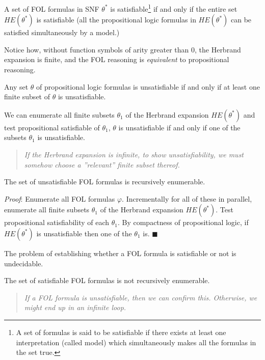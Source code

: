 \documentclass[10pt, letterpaper]{report}
\begin{document}
\begin{theorem}[Herbrand]\label{teo:Herbrand}
    A set of FOL formulas in SNF $\theta^*$ is satisfiable\footnote{
       A set of formulas is said to be satisfiable if there exists at least one interpretation (called model) which simultaneously makes all the formulas in the set true.
    }
    if and only if the entire set $HE(\theta^*)$ is satisfiable (all the propositional logic formulas in $HE(\theta^*)$ can be satisfied simultaneously by a model.)
\end{theorem}
Notice how, without function symbols of arity greater than 0, the Herbrand expansion is finite, and the FOL reasoning is \textit{equivalent} to propositional reasoning.
\begin{theorem}\label{propCompact}
Any set $\theta$ of
propositional logic formulas is unsatisfiable if and only if at least one
finite subset of $\theta$ is unsatisfiable.
\end{theorem}
We can enumerate all finite subsets $\theta_1$ of the Herbrand expansion $HE(\theta^*)$ and test propositional satisfiable of $\theta_1$, $\theta$ is unsatisfiable if and only if one of the subsets $\theta_1$ is unsatisfiable.\begin{quote}
    \textit{
        If the Herbrand expansion is infinite, to show unsatisfiability, we must somehow choose a ''relevant'' finite subset thereof.
    }
\end{quote}
\begin{theorem}
    The set of unsatisfiable FOL formulas is recursively
 enumerable.
\end{theorem}
\textit{Proof}:  Enumerate all FOL formulas $\varphi$. Incrementally for all of these in parallel,
enumerate all finite subsets $\theta_1$ of the Herbrand expansion $HE(\theta^*)$. Test
propositional satisfiability of each  $\theta_1$. By compactness of propositional logic, if
$HE(\theta^*)$ is unsatisfiable then one of the  $\theta_1$ is.
\hfill$\blacksquare$
\begin{theorem}
    The problem of establishing whether a FOL formula is satisfiable or not is undecidable.
\end{theorem}
\begin{corollary}
    The set of satisfiable FOL formulas is not recursively enumerable.
\end{corollary}
\begin{quotation}
    \textit{
        If a FOL formula is unsatisfiable, then we can confirm this. Otherwise, we might end up in an infinite loop.
    }
\end{quotation}
\end{document}
